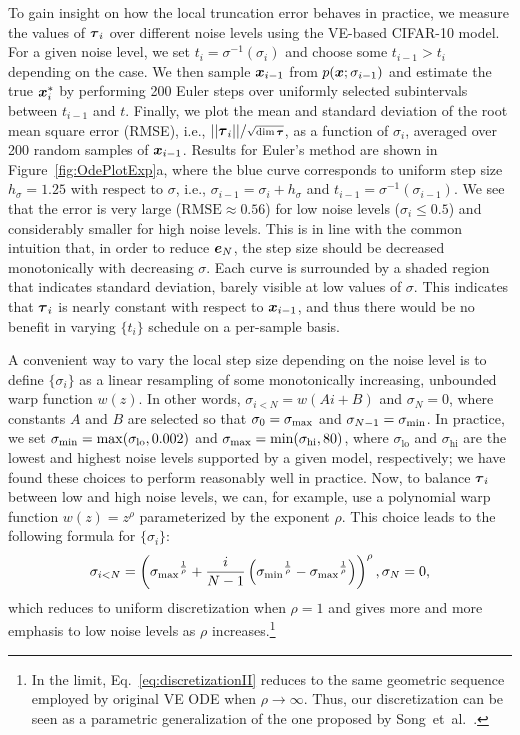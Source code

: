 To gain insight on how the local truncation error behaves in practice, we measure the values of $\boldsymbol{\tau}_i$ over different noise levels using the VE-based CIFAR-10 model.
For a given noise level, we set $t_i = \sigma^{-1}(\sigma_i)$ and choose some $t_{i-1} > t_i$ depending on the case.
We then sample $\boldsymbol{x}_{i-1}$ from $p(\boldsymbol{x}; \sigma_{i-1})$ and estimate the true $\boldsymbol{x}^*_i$ by performing 200 Euler steps over uniformly selected subintervals between $t_{i-1}$ and $t$.
Finally, we plot the mean and standard deviation of the root mean square error (RMSE), i.e., $||\boldsymbol{\tau}_i|| / \scriptstyle\sqrt{\dim\boldsymbol{\tau}}$, as a function of $\sigma_i$, averaged over 200 random samples of $\boldsymbol{x}_{i-1}$.
Results for Euler's method are shown in Figure~\ref{fig:OdePlotExp}a, where the blue curve corresponds to uniform step size $h_\sigma = 1.25$ with respect to $\sigma$, i.e., $\sigma_{i-1} = \sigma_i + h_\sigma$ and $t_{i-1} = \sigma^{-1}(\sigma_{i-1})$.
We see that the error is very large ($\text{RMSE} \approx 0.56$) for low noise levels ($\sigma_i \le 0.5$) and considerably smaller for high noise levels.
This is in line with the common intuition that, in order to reduce $\boldsymbol{e}_N$, the step size should be decreased monotonically with decreasing $\sigma$.
Each curve is surrounded by a shaded region that indicates standard deviation, barely visible at low values of $\sigma$.
This indicates that $\boldsymbol{\tau}_i$ is nearly constant with respect to $\boldsymbol{x}_{i-1}$, and thus there would be no benefit in varying $\{t_i\}$ schedule on a per-sample basis.

A convenient way to vary the local step size depending on the noise level is to define $\{\sigma_i\}$ as a linear resampling of some monotonically increasing, unbounded warp function $w(z)$.
In other words, $\sigma_{i<N} = w(A i + B)$ and $\sigma_N = 0$, where constants $A$ and $B$ are selected so that $\sigma_0 = \smax$ and $\sigma_{N-1} = \smin$. %
In practice, we set $\smin = \max(\sigma_\text{lo}, 0.002)$ and $\smax = \min(\sigma_\text{hi}, 80)$, where $\sigma_\text{lo}$ and $\sigma_\text{hi}$ are the lowest and highest noise levels supported by a given model, respectively; we have found these choices to perform reasonably well in practice.
Now, to balance $\boldsymbol{\tau}_i$ between low and high noise levels, we can, for example, use a polynomial warp function $w(z) = z^\rho$ parameterized by the exponent $\rho$.
This choice leads to the following formula for $\{\sigma_i\}$:
\begin{equation}
\label{eq:discretizationII}
\sigma_{i<N} = \left( {\smax}^\frac{1}{\rho} + \frac{i}{N-1} \left( {\smin}^\frac{1}{\rho} - {\smax}^\frac{1}{\rho} \right) \right)^\rho, \sigma_N = 0,
\end{equation}
which reduces to uniform discretization when $\rho=1$ and gives more and more emphasis to low noise levels as $\rho$ increases.\footnote{
  In the limit, Eq.~\ref{eq:discretizationII} reduces to the same geometric sequence employed by original VE ODE when \mbox{$\rho \rightarrow \infty$}.
  Thus, our discretization can be seen as a parametric generalization of the one proposed by Song~et~al.~\cite{Song2021sde}.
}

